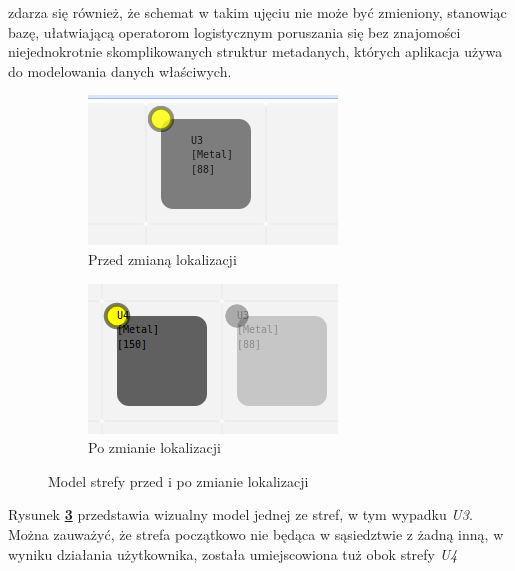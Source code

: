 		zdarza się również, że schemat w takim ujęciu nie może być zmieniony, stanowiąc bazę, ułatwiającą
		operatorom logistycznym poruszania się bez znajomości niejednokrotnie skomplikowanych struktur metadanych, których
		aplikacja używa do modelowania danych właściwych. 
		\begin{figure}[H]
			\centering  
			\begin{subfigure}[b]{0.4\textwidth}
                \centering
                \includegraphics[width=\textwidth]{images/app/unit_before_move}
                \caption{Przed zmianą lokalizacji}
			\label{c7:fig:app:unit_before_move}
       		\end{subfigure}
			\begin{subfigure}[b]{0.4\textwidth}
                \centering
                \includegraphics[width=\textwidth]{images/app/unit_after_move}
                \caption{Po zmianie lokalizacji}
			\label{c7:fig:app:unit_after_move}
       		\end{subfigure}
       		\caption[Aplikacja - Modelowanie struktury magazynu]{Model strefy przed i po zmianie lokalizacji}
			\label{c7:fig:app:unit_modelling}
		\end{figure} 
		Rysunek \textbf{\ref{c7:fig:app:unit_modelling}} przedstawia wizualny model jednej ze stref, 
		w tym wypadku \textit{U3}. Można zauważyć, że strefa początkowo nie będąca w sąsiedztwie z
		żadną inną, w wyniku działania użytkownika, została umiejscowiona tuż obok strefy \textit{U4}
		

